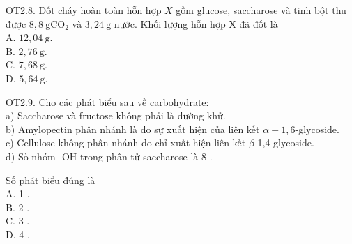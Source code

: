\documentclass[10pt]{article}
\begin{document}
OT2.8. Đốt cháy hoàn toàn hỗn hợp $X$ gồm glucose, saccharose và tinh bột thu được $8,8 \mathrm{~g} \mathrm{CO}_{2}$ và $3,24 \mathrm{~g}$ nước. Khối lượng hỗn hợp X đã đốt là\\
A. $12,04 \mathrm{~g}$.\\
B. $2,76 \mathrm{~g}$.\\
C. $7,68 \mathrm{~g}$.\\
D. $5,64 \mathrm{~g}$.

OT2.9. Cho các phát biểu sau về carbohydrate:\\
a) Saccharose và fructose không phải là đường khử.\\
b) Amylopectin phân nhánh là do sự xuất hiện của liên kết $\alpha-1,6$-glycoside.\\
c) Cellulose không phân nhánh do chỉ xuất hiện liên kết $\beta$-1,4-glycoside.\\
d) Số nhóm -OH trong phân tử saccharose là 8 .

Số phát biểu đúng là\\
A. 1 .\\
B. 2 .\\
C. 3 .\\
D. 4 .
\end{document}
